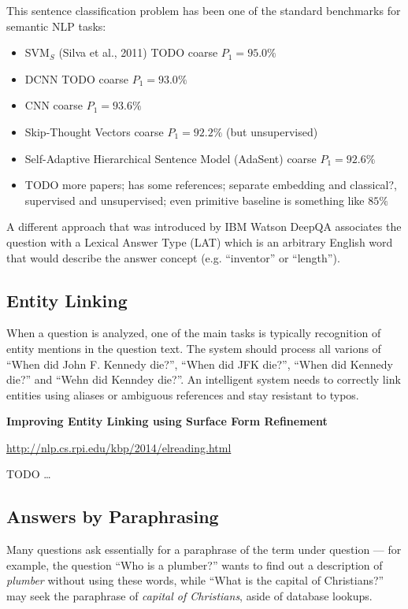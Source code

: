 This sentence classification problem has been one of the standard benchmarks
for semantic NLP tasks:
\begin{itemize}
	\item SVM$_S$ (Silva et al., 2011) TODO coarse $P_1=95.0\%$
	\item DCNN \cite{QtcDCNN} TODO coarse $P_1=93.0\%$
	\item CNN \cite{CNNSentClass} coarse $P_1=93.6\%$
	\item Skip-Thought Vectors \cite{SkipThought} coarse $P_1=92.2\%$ (but unsupervised)
	\item Self-Adaptive Hierarchical Sentence Model \cite{AdaSent} (AdaSent) coarse $P_1=92.6\%$
	\item TODO more papers; \cite{AdaSent} has some references; separate embedding and classical?, supervised and unsupervised; even primitive baseline is something like $85\%$
\end{itemize}

A different approach that was introduced by IBM Watson DeepQA \cite{WatsonTyCor}
associates the question with a Lexical Answer Type (LAT) which is
an arbitrary English word that would describe the answer concept
(e.g. ``inventor'' or ``length'').

\subsection{Entity Linking}

When a question is analyzed, one of the main tasks is typically recognition
of entity mentions in the question text.  The system should process all
varions of ``When did John F. Kennedy die?'', ``When did JFK die?'',
``When did Kennedy die?'' and ``Wehn did Kenndey die?''.  An intelligent
system needs to correctly link entities using aliases or ambiguous
references and stay resistant to typos.

\textbf{Improving Entity Linking using Surface Form Refinement}

\url{http://nlp.cs.rpi.edu/kbp/2014/elreading.html}

TODO \dots

\subsection{Answers by Paraphrasing}

Many questions ask essentially for a paraphrase of the term under
question --- for example, the question ``Who is a plumber?'' wants
to find out a description of \textit{plumber} without using these
words, while ``What is the capital of Christians?'' may seek the
paraphrase of \textit{capital of Christians}, aside of database lookups.

